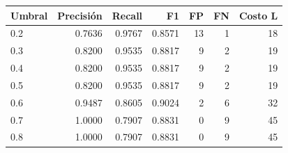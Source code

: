 \begin{tabular}{lrrrrrr}
\toprule
Umbral & Precisión & Recall & F1 & FP & FN & Costo L \\
\midrule
0.2 & 0.7636 & 0.9767 & 0.8571 & 13 & 1 & 18 \\
0.3 & 0.8200 & 0.9535 & 0.8817 & 9 & 2 & 19 \\
0.4 & 0.8200 & 0.9535 & 0.8817 & 9 & 2 & 19 \\
0.5 & 0.8200 & 0.9535 & 0.8817 & 9 & 2 & 19 \\
0.6 & 0.9487 & 0.8605 & 0.9024 & 2 & 6 & 32 \\
0.7 & 1.0000 & 0.7907 & 0.8831 & 0 & 9 & 45 \\
0.8 & 1.0000 & 0.7907 & 0.8831 & 0 & 9 & 45 \\
\bottomrule
\end{tabular}
